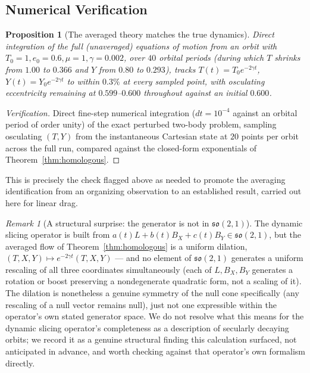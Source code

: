 \documentclass[11pt]{amsart}
\newtheorem{proposition}[theorem]{Proposition}
\theoremstyle{remark}
\newtheorem*{remark}{Remark}
\begin{document}
\subsection{Numerical Verification}

\begin{proposition}[The averaged theory matches the true dynamics]\label{prop:numcheck}
Direct integration of the full (unaveraged) equations of motion from an orbit with $T_0=1,e_0=0.6,\mu=1,\gamma=0.002$, over $40$ orbital periods (during which $T$ shrinks from $1.00$ to $0.366$ and $Y$ from $0.80$ to $0.293$), tracks $T(t)=T_0e^{-2\gamma t}$, $Y(t)=Y_0e^{-2\gamma t}$ to within $0.3\%$ at every sampled point, with osculating eccentricity remaining at $0.599$--$0.600$ throughout against an initial $0.600$.
\end{proposition}

\begin{proof}[Verification]
Direct fine-step numerical integration ($dt=10^{-4}$ against an orbital period of order unity) of the exact perturbed two-body problem, sampling osculating $(T,Y)$ from the instantaneous Cartesian state at $20$ points per orbit across the full run, compared against the closed-form exponentials of Theorem~\ref{thm:homologous}.
\end{proof}

This is precisely the check flagged above as needed to promote the averaging identification from an organizing observation to an established result, carried out here for linear drag.

\begin{remark}[A structural surprise: the generator is not in $\mathfrak{so}(2,1)$]
The dynamic slicing operator is built from $a(t)L+b(t)B_X+c(t)B_Y\in\mathfrak{so}(2,1)$, but the averaged flow of Theorem~\ref{thm:homologous} is a uniform dilation, $(T,X,Y)\mapsto e^{-2\gamma t}(T,X,Y)$ --- and no element of $\mathfrak{so}(2,1)$ generates a uniform rescaling of all three coordinates simultaneously (each of $L,B_X,B_Y$ generates a rotation or boost preserving a nondegenerate quadratic form, not a scaling of it). The dilation is nonetheless a genuine symmetry of the null cone specifically (any rescaling of a null vector remains null), just not one expressible within the operator's own stated generator space. We do not resolve what this means for the dynamic slicing operator's completeness as a description of secularly decaying orbits; we record it as a genuine structural finding this calculation surfaced, not anticipated in advance, and worth checking against that operator's own formalism directly.
\end{remark}
\end{document}
